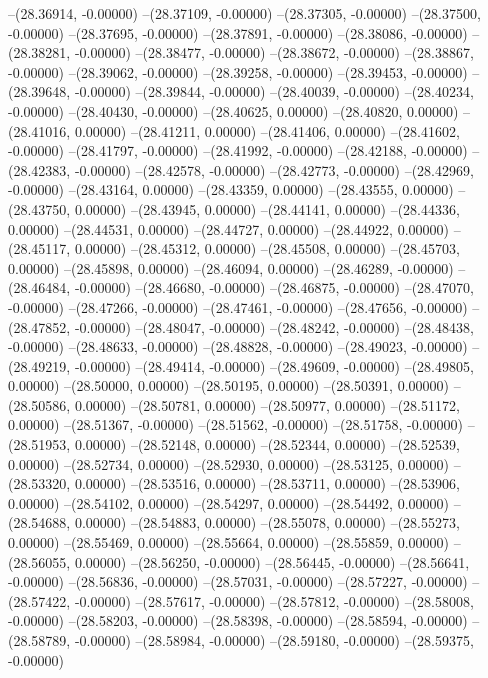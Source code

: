 --(28.36914, -0.00000)
--(28.37109, -0.00000)
--(28.37305, -0.00000)
--(28.37500, -0.00000)
--(28.37695, -0.00000)
--(28.37891, -0.00000)
--(28.38086, -0.00000)
--(28.38281, -0.00000)
--(28.38477, -0.00000)
--(28.38672, -0.00000)
--(28.38867, -0.00000)
--(28.39062, -0.00000)
--(28.39258, -0.00000)
--(28.39453, -0.00000)
--(28.39648, -0.00000)
--(28.39844, -0.00000)
--(28.40039, -0.00000)
--(28.40234, -0.00000)
--(28.40430, -0.00000)
--(28.40625, 0.00000)
--(28.40820, 0.00000)
--(28.41016, 0.00000)
--(28.41211, 0.00000)
--(28.41406, 0.00000)
--(28.41602, -0.00000)
--(28.41797, -0.00000)
--(28.41992, -0.00000)
--(28.42188, -0.00000)
--(28.42383, -0.00000)
--(28.42578, -0.00000)
--(28.42773, -0.00000)
--(28.42969, -0.00000)
--(28.43164, 0.00000)
--(28.43359, 0.00000)
--(28.43555, 0.00000)
--(28.43750, 0.00000)
--(28.43945, 0.00000)
--(28.44141, 0.00000)
--(28.44336, 0.00000)
--(28.44531, 0.00000)
--(28.44727, 0.00000)
--(28.44922, 0.00000)
--(28.45117, 0.00000)
--(28.45312, 0.00000)
--(28.45508, 0.00000)
--(28.45703, 0.00000)
--(28.45898, 0.00000)
--(28.46094, 0.00000)
--(28.46289, -0.00000)
--(28.46484, -0.00000)
--(28.46680, -0.00000)
--(28.46875, -0.00000)
--(28.47070, -0.00000)
--(28.47266, -0.00000)
--(28.47461, -0.00000)
--(28.47656, -0.00000)
--(28.47852, -0.00000)
--(28.48047, -0.00000)
--(28.48242, -0.00000)
--(28.48438, -0.00000)
--(28.48633, -0.00000)
--(28.48828, -0.00000)
--(28.49023, -0.00000)
--(28.49219, -0.00000)
--(28.49414, -0.00000)
--(28.49609, -0.00000)
--(28.49805, 0.00000)
--(28.50000, 0.00000)
--(28.50195, 0.00000)
--(28.50391, 0.00000)
--(28.50586, 0.00000)
--(28.50781, 0.00000)
--(28.50977, 0.00000)
--(28.51172, 0.00000)
--(28.51367, -0.00000)
--(28.51562, -0.00000)
--(28.51758, -0.00000)
--(28.51953, 0.00000)
--(28.52148, 0.00000)
--(28.52344, 0.00000)
--(28.52539, 0.00000)
--(28.52734, 0.00000)
--(28.52930, 0.00000)
--(28.53125, 0.00000)
--(28.53320, 0.00000)
--(28.53516, 0.00000)
--(28.53711, 0.00000)
--(28.53906, 0.00000)
--(28.54102, 0.00000)
--(28.54297, 0.00000)
--(28.54492, 0.00000)
--(28.54688, 0.00000)
--(28.54883, 0.00000)
--(28.55078, 0.00000)
--(28.55273, 0.00000)
--(28.55469, 0.00000)
--(28.55664, 0.00000)
--(28.55859, 0.00000)
--(28.56055, 0.00000)
--(28.56250, -0.00000)
--(28.56445, -0.00000)
--(28.56641, -0.00000)
--(28.56836, -0.00000)
--(28.57031, -0.00000)
--(28.57227, -0.00000)
--(28.57422, -0.00000)
--(28.57617, -0.00000)
--(28.57812, -0.00000)
--(28.58008, -0.00000)
--(28.58203, -0.00000)
--(28.58398, -0.00000)
--(28.58594, -0.00000)
--(28.58789, -0.00000)
--(28.58984, -0.00000)
--(28.59180, -0.00000)
--(28.59375, -0.00000)
